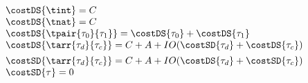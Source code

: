 \begin{flushleft}
$\begin{array}{l}
  \costDS{\tint} = C
\\
  \costDS{\tnat} = C
\\
  \costDS{\tpair{\tau_0}{\tau_1}} = \costDS{\tau_0} + \costDS{\tau_1}
\\
  \costDS{\tarr{\tau_d}{\tau_c}} = C + A + IO(\costSD{\tau_d} + \costDS{\tau_c})
\\[1ex]
  \costSD{\tarr{\tau_d}{\tau_c}} = C + A + IO(\costDS{\tau_d} + \costSD{\tau_c})
\\
  \costSD{\tau} = 0
\end{array}$
\end{flushleft}
